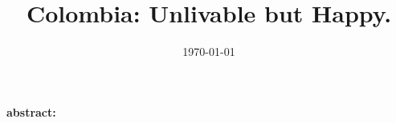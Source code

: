 \documentclass[10pt, letterpaper]{article}
\date{{}\today \hspace{.2in}\xxivtime}
\title{Colombia: Unlivable but Happy.} %
\author{
}
\begin{document}

%
\maketitle
\vspace{-.4in}
\begin{center}

\end{center}


\textbf{abstract:}
\begin{abstract}

\end{abstract}
\end{document}
